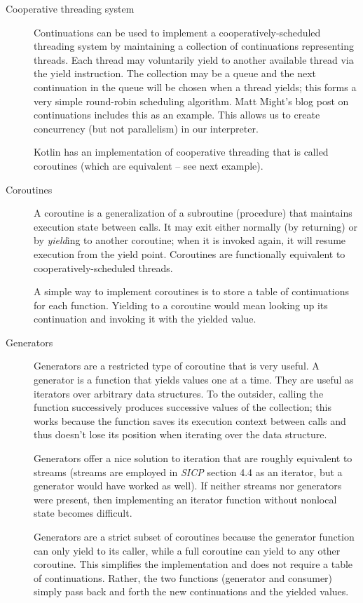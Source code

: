 \documentclass[]{article}
\begin{document}
\begin{description}
  
\item[Cooperative threading system] Continuations can be used to implement a cooperatively-scheduled threading system by maintaining a collection of continuations representing threads. Each thread may voluntarily yield to another available thread via the yield instruction. The collection may be a queue and the next continuation in the queue will be chosen when a thread yields; this forms a very simple round-robin scheduling algorithm. Matt Might's blog post on continuations includes this as an example. This allows us to create concurrency (but not parallelism) in our interpreter.

  Kotlin has an implementation of cooperative threading that is called coroutines (which are equivalent -- see next example).
  
\item[Coroutines] A coroutine is a generalization of a subroutine (procedure) that maintains execution state between calls. It may exit either normally (by returning) or by \textit{yield}ing to another coroutine; when it is invoked again, it will resume execution from the yield point. Coroutines are functionally equivalent to cooperatively-scheduled threads.

  A simple way to implement coroutines is to store a table of continuations for each function. Yielding to a coroutine would mean looking up its continuation and invoking it with the yielded value.
  
\item[Generators] Generators are a restricted type of coroutine that is very useful. A generator is a function that yields values one at a time. They are useful as iterators over arbitrary data structures. To the outsider, calling the function successively produces successive values of the collection; this works because the function saves its execution context between calls and thus doesn't lose its position when iterating over the data structure.

  Generators offer a nice solution to iteration that are roughly equivalent to streams (streams are employed in \textit{SICP} section 4.4 as an iterator, but a generator would have worked as well). If neither streams nor generators were present, then implementing an iterator function without nonlocal state becomes difficult.

  Generators are a strict subset of coroutines because the generator function can only yield to its caller, while a full coroutine can yield to any other coroutine. This simplifies the implementation and does not require a table of continuations. Rather, the two functions (generator and consumer) simply pass back and forth the new continuations and the yielded values.


\end{description}
\end{document}
